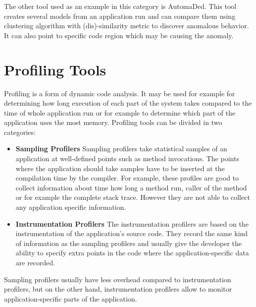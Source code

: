 The other tool used as an example in this category is AutomaDed. This tool creates several models from an application run and can compare them using clustering algorithm with (dis)-similarity metric to discover anomalous behavior. It can also point to specific code region which may be causing the anomaly.

\section{Profiling Tools}
Profiling is a form of dynamic code analysis. It may be used for example for determining how long execution of each part of the system takes compared to the time of whole application run or for example to determine which part of the application uses the most memory. Profiling tools can be divided in two categories:
\begin{itemize}
	\item \textbf{Sampling Profilers} \newline
Sampling profilers take statistical samples of an application at well-defined points such as method invocations. The points where the application should take samples have to be inserted at the compilation time by the compiler. For example, these profiles are good to collect information about time how long a method run, caller of the method or for example the complete stack trace. However they are not able to collect any application specific information.
	\item \textbf{Instrumentation Profilers} \newline
The instrumentation profilers are based on the instrumentation of the application's source code. They record the same kind of information as the sampling profilers and usually give the developer the ability to specify extra points in the code where the application-specific data are recorded. 
\end{itemize}
 Sampling profilers usually have less overhead compared to instrumentation profilers, but on the other hand, instrumentation profilers allow to monitor application-specific parts of the application.
 
